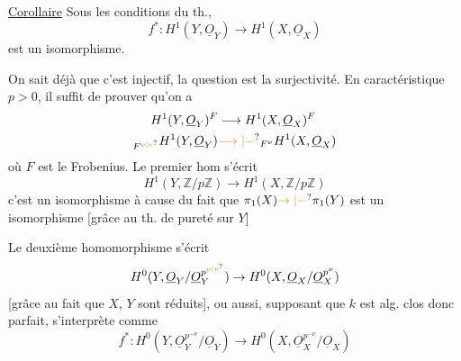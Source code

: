 \uline{Corollaire} Sous les conditions du th., 
\[
f^*:H^1(Y,\underline{O}_Y)\to H^1(X,\underline{O}_X)
\]
est un isomorphisme.

On sait déjà que c'est injectif, la question
est la surjectivité.  En caractéristique $p>0$,
il suffit de prouver qu'on a 
\[
\begin{aligned}
H^1(Y,\underline{O}_Y)^F&\longrightarrow H^1(X,\underline{O}_X)^F\\
{}_{F^{\unsure{\nu|v}}}H^1(Y,\underline{O}_Y)&\unsure{\longrightarrow|-}{}_{F^{\nu}}H^1(X,\underline{O}_X)
\end{aligned}
\]
où $F$ est le Frobenius. Le premier
hom s'écrit
\[
H^1(Y,\mathbb Z/p\mathbb Z)\to H^1(X,\mathbb Z/p\mathbb Z)
\]
c'est un isomorphisme à cause du fait que
$\pi_1(X)\unsure{\to|-}\pi_1(Y)$ est un isomorphisme [grâce au
th. de pureté sur $Y$]
\margin{$Y$ \uline{régulier} \unsure{$[$|$\Gamma$}}

Le deuxième homomorphisme s'écrit
\[
H^0(Y,\underline{O}_Y/\underline{O}_Y^{p^{\unsure{\nu|v}}})\to H^0(X,\underline{O}_X/\underline{O}_X^{p^\nu})
\]
[grâce au fait que $X$, $Y$ sont réduits],
ou aussi, supposant que $k$ est alg. clos
donc parfait, s'interprète comme
\[
f^*:H^0(Y,\underline{O}_Y^{p^{-\nu}}/\underline{O}_Y)\to H^0(X,\underline{O}_X^{p^{-\nu}}/\underline{O}_X)
\]

